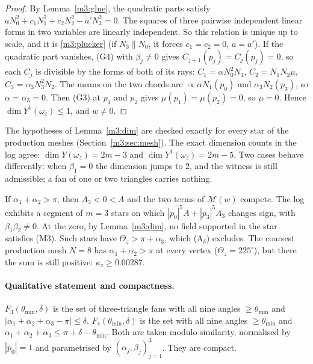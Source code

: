 \begin{proof}
By Lemma~\ref{m3:glue}, the quadratic parts satisfy $aN_0^2+c_1N_1^2+c_2N_2^2-a'N_3^2=0$. The squares of three pairwise independent linear forms in two variables are linearly independent. So this relation is unique up to scale, and it is \eqref{m3:plucker} (if $N_3\parallel N_0$, it forces $c_1=c_2=0$, $a=a'$). If the quadratic part vanishes, (G4) with $\beta_j\ne0$ gives $C_{j+1}(p_j)=C_j(p_j)=0$, so each $C_j$ is divisible by the forms of both of its rays: $C_1=\alpha N_0^2N_1$, $C_2=N_1N_2\mu$, $C_3=\alpha_3N_3^2N_2$. The means on the two chords are $\propto\alpha N_1(p_0)$ and $\alpha_3N_2(p_3)$, so $\alpha=\alpha_3=0$. Then (G3) at $p_1$ and $p_2$ gives $\mu(p_1)=\mu(p_2)=0$, so $\mu=0$. Hence $\dim Y^1(\omega_z)\le1$, and $w\ne0$.
\end{proof}

The hypotheses of Lemma~\ref{m3:dim} are checked exactly for every star of the production meshes (Section~\ref{m3:sec:mesh}). The exact dimension counts in the log agree: $\dim Y(\omega_z)=2m-3$ and $\dim Y^1(\omega_z)=2m-5$. Two cases behave differently: when $\beta_1=0$ the dimension jumps to $2$, and the witness is still admissible; a fan of one or two triangles carries nothing.

\begin{remark}\label{m3:neg}
If $\alpha_1+\alpha_2>\pi$, then $A_3<0<A$ and the two terms of $\mathcal M(w)$ compete. The log exhibits a segment of $m=3$ stars on which $|p_0|^5A+|p_3|^5A_3$ changes sign, with $\beta_1\beta_2\ne0$. At the zero, by Lemma~\ref{m3:dim}, no field supported in the star satisfies (M3). Such stars have $\Theta_z>\pi+\alpha_3$, which (A$_\delta$) excludes. The coarsest production mesh $N=8$ has $\alpha_1+\alpha_2>\pi$ at every vertex ($\Theta_z=225^\circ$), but there the sum is still positive: $\kappa_z\ge0.00287$.
\end{remark}

\paragraph{Qualitative statement and compactness.}
\begin{definition}[Families]\label{m3:fam}
$F_3(\theta_{\min},\delta)$ is the set of three-triangle fans with all nine angles $\ge\theta_{\min}$ and $|\alpha_1+\alpha_2+\alpha_3-\pi|\le\delta$. $F_s(\theta_{\min},\delta)$ is the set with all nine angles $\ge\theta_{\min}$ and $\alpha_1+\alpha_2+\alpha_3\le\pi+\delta-\theta_{\min}$. Both are taken modulo similarity, normalised by $|p_0|=1$ and parametrised by $(\alpha_j,\beta_j)_{j=1}^3$. They are compact.
\end{definition}

